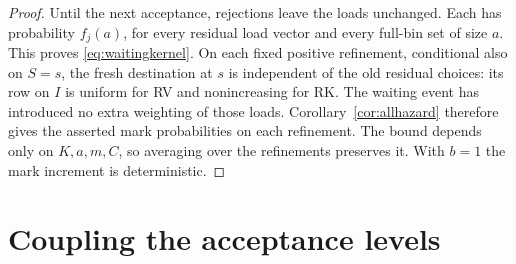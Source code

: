 \documentclass[11pt]{article}
\begin{document}
\begin{proof}
Until the next acceptance, rejections leave the loads unchanged.
Each has probability $f_j(a)$, for every residual load vector and
every full-bin set of size $a$. This proves
\eqref{eq:waitingkernel}. On each fixed positive refinement, conditional also on $S=s$, the fresh
destination at $s$ is independent of the old residual choices: its row on $I$
is uniform for RV and nonincreasing for RK. The waiting event has
introduced no extra weighting of those loads. Corollary~\ref{cor:allhazard}
therefore gives the asserted mark probabilities on each refinement.
The bound depends only on $K,a,m,C$, so averaging over the refinements
preserves it. With $b=1$ the mark increment is deterministic.
\end{proof}

\section{Coupling the acceptance levels}\label{sec:coupling}
\end{document}
